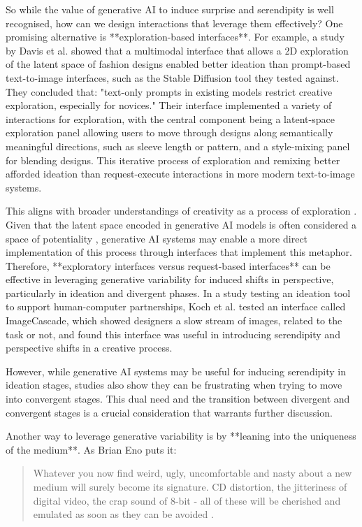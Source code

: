So while the value of generative AI to induce surprise and serendipity is well recognised, how can we design interactions that leverage them effectively? One promising alternative is **exploration-based interfaces**. For example, a study by Davis et al. \cite{Davis2024-ml} showed that a multimodal interface that allows a 2D exploration of the latent space of fashion designs enabled better ideation than prompt-based text-to-image interfaces, such as the Stable Diffusion tool they tested against. They concluded that: "text-only prompts in existing models restrict creative exploration, especially for novices." Their interface implemented a variety of interactions for exploration, with the central component being a latent-space exploration panel allowing users to move through designs along semantically meaningful directions, such as sleeve length or pattern, and a style-mixing panel for blending designs. This iterative process of exploration and remixing better afforded ideation than request-execute interactions in more modern text-to-image systems.

This aligns with broader understandings of creativity as a process of exploration \cite{Boden1998-yn, Wiggins2019-yj}. Given that the latent space encoded in generative AI models is often considered a space of potentiality \cite{Schaerf2024-gf}, generative AI systems may enable a more direct implementation of this process through interfaces that implement this metaphor. Therefore, **exploratory interfaces versus request-based interfaces** can be effective in leveraging generative variability for induced shifts in perspective, particularly in ideation and divergent phases. In a study testing an ideation tool to support human-computer partnerships, Koch et al. \cite{Koch2020-gx} tested an interface called ImageCascade, which showed designers a slow stream of images, related to the task or not, and found this interface was useful in introducing serendipity and perspective shifts in a creative process.

However, while generative AI systems may be useful for inducing serendipity in ideation stages, studies also show they can be frustrating when trying to move into convergent stages. This dual need and the transition between divergent and convergent stages is a crucial consideration that warrants further discussion.

Another way to leverage generative variability is by **leaning into the uniqueness of the medium**. As Brian Eno puts it:

\begin{quote}
    Whatever you now find weird, ugly, uncomfortable and nasty about a new medium will surely become its signature. CD distortion, the jitteriness of digital video, the crap sound of 8-bit - all of these will be cherished and emulated as soon as they can be avoided \cite{Eno2007-fl}.
\end{quote}

